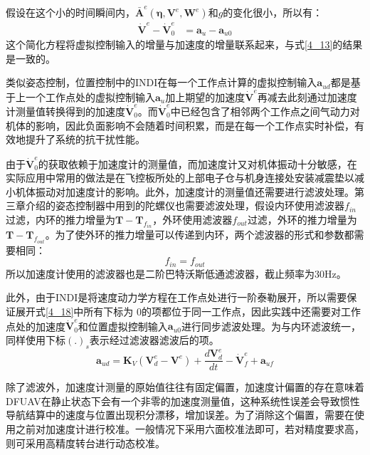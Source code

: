 假设在这个小的时间瞬间内，${\boldsymbol{\bar A}}^e(\boldsymbol{\eta},\boldsymbol{V}^e,\boldsymbol{W}^e)$和$g$的变化很小，所以有：
\begin{equation}
    \begin{aligned}
        \dot{\boldsymbol{V}}^e - \dot{\boldsymbol{V}}^e_0&=\boldsymbol{a}_u - \boldsymbol{a}_{u0}
    \end{aligned}
    \label{4_20}
\end{equation}
这个简化方程将虚拟控制输入的增量与加速度的增量联系起来，与式\eqref{4_13}的结果是一致的。

类似姿态控制，位置控制中的INDI在每一个工作点计算的虚拟控制输入$\boldsymbol{a}_{ud}$都是基于上一个工作点处的虚拟控制输入$\boldsymbol{a}_{u}$加上期望的加速度$\boldsymbol{\dot{V}}^e$再减去此刻通过加速度计测量值转换得到的加速度$\boldsymbol{\dot{V}}^e_0$。而$\boldsymbol{\dot{V}}^e_0$中已经包含了相邻两个工作点之间气动力对机体的影响，因此负面影响不会随着时间积累，而是在每一个工作点实时补偿，有效地提升了系统的抗干扰性能。

由于$\dot{\boldsymbol{V}}^e_0$的获取依赖于加速度计的测量值，而加速度计又对机体振动十分敏感，在实际应用中常用的做法是在飞控板所处的上部电子仓与机身连接处安装减震垫以减小机体振动对加速度计的影响。此外，加速度计的测量值还需要进行滤波处理。第三章介绍的姿态控制器中用到的陀螺仪也需要滤波处理，假设内环使用滤波器$f_{in}$过滤，内环的推力增量为$\boldsymbol{T}-\boldsymbol{T}_{f_{in}}$，外环使用滤波器$f_{out}$过滤，外环的推力增量为$\boldsymbol{T}-\boldsymbol{T}_{f_{out}}$。为了使外环的推力增量可以传递到内环，两个滤波器的形式和参数都需要相同\cite{smeurCascadedIncrementalNonlinear2018b}：
\begin{equation}
        f_{in}=f_{out}
    \label{4_21}
\end{equation}
所以加速度计使用的滤波器也是二阶巴特沃斯低通滤波器，截止频率为30Hz。

此外，由于INDI是将速度动力学方程在工作点处进行一阶泰勒展开，所以需要保证展开式\eqref{4_18}中所有下标为 0的项都位于同一工作点，因此实践中还需要对工作点处的加速度$\boldsymbol{\dot{V}}^e_0$和位置虚拟控制输入$\boldsymbol{a}_{u0}$进行同步滤波处理。为与内环滤波统一，同样使用下标$(.)_s$表示经过滤波器滤波后的项。
\begin{equation}
        \boldsymbol{a}_{ud}=\boldsymbol{K}_{V}(\boldsymbol{V}_d^e-\boldsymbol{V}^e)+\frac{d\boldsymbol{V}^e_d}{dt}-\boldsymbol{\dot{V}}^e_f+\boldsymbol{a}_{uf}
    \label{4_22}
\end{equation}

除了滤波外，加速度计测量的原始值往往有固定偏置，加速度计偏置的存在意味着DFUAV在静止状态下会有一个非零的加速度测量值，这种系统性误差会导致惯性导航结算中的速度与位置出现积分漂移，增加误差。为了消除这个偏置，需要在使用之前对加速度计进行校准。一般情况下采用六面校准法即可，若对精度要求高，则可采用高精度转台进行动态校准。

